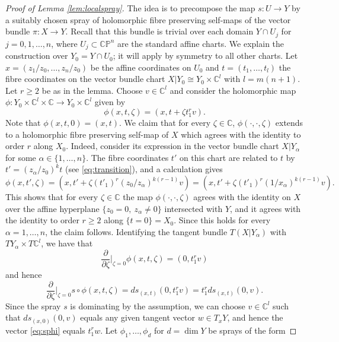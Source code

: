 \documentclass[12pt]{amsart}
\theoremstyle{definition}
\numberwithin{equation}{section}
\numberwithin{figure}{section}
\newcommand\C{\mathbb{C}}
\newcommand\CP{\mathbb{CP}}
\newcommand\di{\partial}
\numberwithin{equation}{section}
\begin{document}
\begin{proof}[Proof of Lemma \ref{lem:localspray}]
The idea is to precompose the map $s:U\to Y$ by a suitably 
chosen spray of holomorphic fibre preserving 
self-maps of the vector bundle $\pi:X\to Y$. 
Recall that this bundle is trivial over 
each domain $Y\cap U_j$ for $j=0,1,\ldots,n$, where 
$U_j\subset\CP^n$ are the standard affine charts.
We explain the construction over $Y_0=Y\cap U_0$; it will
apply by symmetry to all other charts.
Let $x=(z_1/z_0,\ldots,z_n/z_0)$ be 
the affine coordinates on $U_0$ and $t=(t_1,\ldots,t_{l})$
the fibre coordinates on the vector bundle chart 
$X|Y_0\cong Y_0\times \C^{l}$ with $l=m(n+1)$. 
Let $r \ge 2$ be as in the lemma. 
Choose $v\in \C^{l}$ %
and consider the holomorphic map 
$\phi:Y_0 \times \C^l \times \C \to Y_0 \times \C^l$ given by
\begin{equation}\label{eq:phi}
	\phi(x,t,\zeta) = (x,t+ \zeta t_1^r v).
\end{equation}
Note that $\phi(x,t,0)=(x,t)$. We claim that for every $\zeta\in\C$, 
$\phi(\cdotp,\cdotp,\zeta)$ extends to a holomorphic 
fibre preserving self-map of $X$ which agrees 
with the identity to order $r$ along $X_0$.
Indeed, consider its expression in the  
vector bundle chart $X|Y_\alpha$ for some $\alpha\in \{1,\ldots,n\}$.
The fibre coordinates $t'$ on this chart are related to $t$ 
by $t'=(z_\alpha/z_0)^k t$ (see \eqref{eq:transition}), 
and a calculation gives
\[
	\phi(x,t',\zeta)=\left(x,t'+ \zeta (t'_1)^r (z_0/z_\alpha)^{k(r-1)} v\right)
	= \left(x,t'+ \zeta (t'_1)^r (1/x_\alpha)^{k(r-1)} v\right). 
\]
This shows that for every $\zeta\in\C$ 
the map $\phi(\cdotp,\cdotp,\zeta)$ agrees with the identity on $X$ 
over the affine hyperplane $\{z_0=0,\ z_\alpha\ne 0\}$ intersected with $Y$, 
and it agrees with the identity to order $r\ge 2$ along 
$\{t=0\}=X_0$. Since this holds for every $\alpha=1,\ldots,n$, 
the claim follows. Identifying the tangent bundle $T(X|Y_\alpha)$ with 
$TY_\alpha \times T\C^l$, we have that 
\[
	\frac{\di}{\di\zeta}\Big|_{\zeta=0} \phi(x,t,\zeta) = (0,t_1^r v)
\]
and hence
\begin{equation}\label{eq:sphi}
	\frac{\di}{\di\zeta}\Big|_{\zeta=0} s\circ \phi(x,t,\zeta)=
	ds_{(x,t)} (0,t_1^r v) = t_1^r ds_{(x,t)}(0,v).
\end{equation}
Since the spray $s$ is dominating by the assumption, 
we can choose $v\in \C^l$ such that 
$ds_{(x,0)}(0,v)$ equals any given tangent vector $w\in T_x Y$,
and hence the vector \eqref{eq:sphi} equals $t_1^r w$.
Let $\phi_1,\ldots,\phi_d$ for $d=\dim Y$ be sprays of the form

\end{proof}
\end{document}
